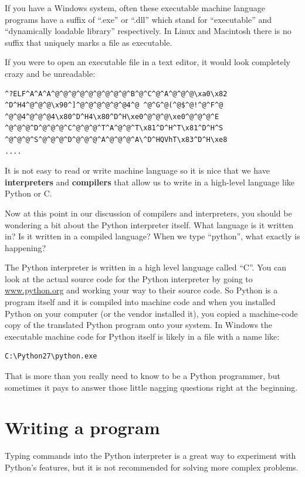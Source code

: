 \documentclass[11pt]{book}
\begin{document}
If you have a Windows system, often these executable machine language programs have a
suffix of ``.exe'' or ``.dll'' which stand for ``executable'' and ``dynamically loadable
library'' respectively.  In Linux and Macintosh there is no suffix that uniquely marks
a file as executable.

If you were to open an executable file in a text editor, it would look 
completely crazy and be unreadable:

\beforeverb
\begin{verbatim}
^?ELF^A^A^A^@^@^@^@^@^@^@^@^@^B^@^C^@^A^@^@^@\xa0\x82
^D^H4^@^@^@\x90^]^@^@^@^@^@^@4^@ ^@^G^@(^@$^@!^@^F^@
^@^@4^@^@^@4\x80^D^H4\x80^D^H\xe0^@^@^@\xe0^@^@^@^E
^@^@^@^D^@^@^@^C^@^@^@^T^A^@^@^T\x81^D^H^T\x81^D^H^S
^@^@^@^S^@^@^@^D^@^@^@^A^@^@^@^A\^D^HQVhT\x83^D^H\xe8
....
\end{verbatim}
\afterverb
%
It is not easy to read or write machine language so it is nice that we have
{\bf interpreters} and {\bf compilers} that allow us to write in a high-level
language like Python or C.

Now at this point in our discussion of compilers and interpreters, you should 
be wondering a bit about the Python interpreter itself.  What language is 
it written in?  Is it written in a compiled language?  When we type
``python'', what exactly is happening?

The Python interpreter is written in a high level language called ``C''.  
You can look at the actual source code for the Python interpreter by
going to \url{www.python.org} and working your way to their source code.
So Python is a program itself and it is compiled into machine code and
when you installed Python on your computer (or the vendor installed it),
you copied a machine-code copy of the translated Python program onto your
system.   In Windows the executable machine code for Python itself is likely
in a file with a name like:

\beforeverb
\begin{verbatim}
C:\Python27\python.exe
\end{verbatim}
\afterverb
%
That is more than you really need to know to be a Python programmer, but
sometimes it pays to answer those little nagging questions right at 
the beginning.

\section{Writing a program}

Typing commands into the Python interpreter is a great way to experiment 
with Python's features, but it is not recommended for solving more complex problems.
\end{document}

